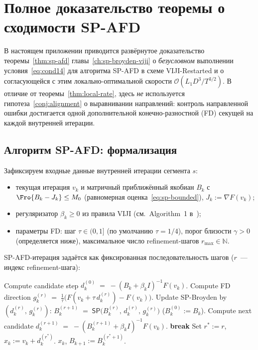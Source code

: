 \chapter{Полное доказательство теоремы о сходимости SP-AFD}\label{app:sp-afd-proof}

В настоящем приложении приводится развёрнутое доказательство
теоремы~\ref{thm:sp-afd} главы~\ref{ch:sp-broyden-viji} о
\emph{безусловном} выполнении условия~\eqref{eq:cond14} для алгоритма
SP-AFD в схеме VIJI-Restarted и о согласующейся с этим
локально-оптимальной скорости $\mathcal O(L_1 D^3 / T^{3/2})$. В отличие
от теоремы~\ref{thm:local-rate}, здесь \emph{не} используется
гипотеза~\ref{conj:alignment} о выравнивании направлений: контроль
направленной ошибки достигается одной дополнительной конечно-разностной
(FD) секущей на каждой внутренней итерации.

\section{Алгоритм SP-AFD: формализация}
\label{sec:app-afd:alg}

Зафиксируем входные данные внутренней итерации сегмента $s$:
\begin{itemize}
\item текущая итерация $v_k$ и матричный приближённый якобиан $B_k$ с
      $\Fro{B_k - J_k} \le M_0$ (равномерная оценка~\eqref{eq:sp-bounded}),
      $J_k := \nabla F(v_k)$;
\item регуляризатор $\beta_k \ge 0$ из правила VIJI (см.~Algorithm~1
      в~\cite{Agafonov2024VIJI});
\item параметры FD: шаг $\tau \in (0, 1]$ (по умолчанию $\tau = 1/4$),
      порог близости $\gamma > 0$ (определяется ниже), максимальное
      число refinement-шагов $r_{\max} \in \mathbb{N}$.
\end{itemize}
SP-AFD-итерация задаётся как фиксированная последовательность шагов
($r$~--- индекс refinement-шага):
\begin{algorithm}[t]
\caption{SP-AFD: одна внутренняя итерация в $v_k$}
\label{alg:sp-afd-inner}
\begin{algorithmic}[1]
\State Compute candidate step $d^{(0)}_k \;=\; -(B_k + \beta_k I)^{-1} F(v_k)$.
  \State Compute FD direction
         $g^{(r)}_k \;=\; \tfrac{1}{\tau}\bigl(F(v_k + \tau\, d^{(r)}_k) - F(v_k)\bigr)$.
  \State Update SP-Broyden by $(d^{(r)}_k,\, g^{(r)}_k)$:
         $B_k^{(r+1)} \;=\; \mathsf{SP}\bigl(B_k^{(r)},\, d^{(r)}_k,\, g^{(r)}_k\bigr)$
         \quad ($B_k^{(0)} := B_k$).
  \State Compute next candidate
         $d^{(r+1)}_k \;=\; -(B_k^{(r+1)} + \beta_k I)^{-1} F(v_k)$.
       \State \textbf{break} 
  \EndIf
\EndFor
\State Set $r^{*} := r$, $x_k := v_k + d^{(r^{*})}_k$.
\State \Return $x_k$, $B_{k+1} := B_k^{(r^{*}+1)}$.
\end{algorithmic}
\end{algorithm}

